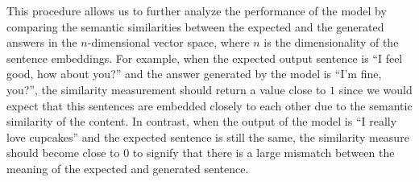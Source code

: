 This procedure allows us to further analyze the performance of the model by comparing the semantic similarities between the expected and the generated answers in the $n$-dimensional vector space, where $n$ is the dimensionality of the sentence embeddings. For example, when the expected output sentence is ``I feel good, how about you?'' and the answer generated by the model is ``I'm fine, you?'', the similarity measurement should return a value close to $1$ since we would expect that this sentences are embedded closely to each other due to the semantic similarity of the content. In contrast, when the output of the model is ``I really love cupcakes'' and the expected sentence is still the same, the similarity measure should become close to $0$ to signify that there is a large mismatch between the meaning of the expected and generated sentence.

